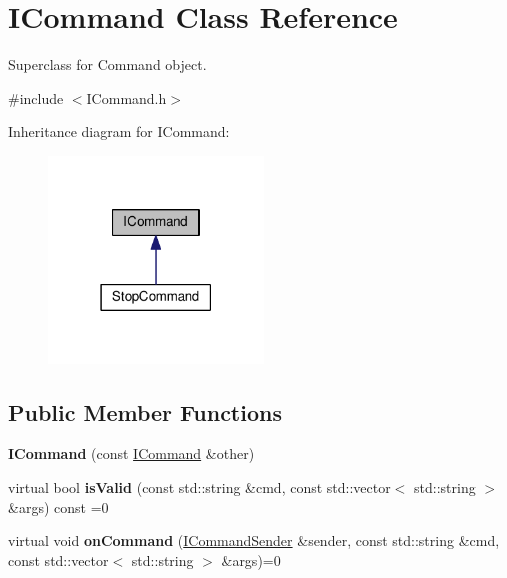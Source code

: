 \hypertarget{class_i_command}{\section{I\-Command Class Reference}
\label{class_i_command}
}


Superclass for Command object.  




{\ttfamily \#include $<$I\-Command.\-h$>$}



Inheritance diagram for I\-Command\-:
\nopagebreak
\begin{figure}[H]
\begin{center}
\leavevmode
\includegraphics[width=162pt]{class_i_command__inherit__graph}
\end{center}
\end{figure}
\subsection*{Public Member Functions}
\begin{DoxyCompactItemize}
\item 
\hypertarget{class_i_command_a1a3e297aea5c94d785060e49801860dc}{{\bfseries I\-Command} (const \hyperlink{class_i_command}{I\-Command} \&other)}\label{class_i_command_a1a3e297aea5c94d785060e49801860dc}

\item 
\hypertarget{class_i_command_acb0beea12bd5ec963884dc35d4d48014}{virtual bool {\bfseries is\-Valid} (const std\-::string \&cmd, const std\-::vector$<$ std\-::string $>$ \&args) const =0}\label{class_i_command_acb0beea12bd5ec963884dc35d4d48014}

\item 
\hypertarget{class_i_command_a55f931bb7304e2bc591ba2edd717e86c}{virtual void {\bfseries on\-Command} (\hyperlink{class_i_command_sender}{I\-Command\-Sender} \&sender, const std\-::string \&cmd, const std\-::vector$<$ std\-::string $>$ \&args)=0}\label{class_i_command_a55f931bb7304e2bc591ba2edd717e86c}

\end{DoxyCompactItemize}


